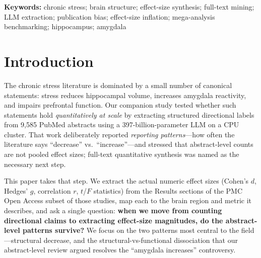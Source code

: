 \documentclass[11pt]{article}
\begin{document}
\begin{abstract}
\textbf{Conclusions.} Moving from count-based reporting patterns to extracted
effect-size magnitudes confirms the \emph{direction} of stress-related structural
decrease, but benchmarking against consortium mega-analyses shows the extracted
\emph{magnitudes} are inflated several-fold---demonstrating that large-scale LLM
mining of published text can quantify, rather than escape, the field's
publication bias. We are transparent about the pipeline's validated direction
accuracy (94\%), its mapping yield ($\sim$43\%), and the absence of usable sample
sizes for formal pooling; these define the boundary between this synthesis and a
definitive meta-analysis. The list of all included studies is provided as
Supplementary Table~S1.
\end{abstract}

\medskip
\noindent\textbf{Keywords:} chronic stress; brain structure; effect-size
synthesis; full-text mining; LLM extraction; publication bias; effect-size
inflation; mega-analysis benchmarking; hippocampus; amygdala

\section{Introduction}

The chronic stress literature is dominated by a small number of canonical
statements: stress reduces hippocampal volume, increases amygdala reactivity,
and impairs prefrontal function. Our companion study \cite{kang2026scoping}
tested whether such statements hold \emph{quantitatively at scale} by extracting
structured directional labels from 9{,}585 PubMed abstracts using a
397-billion-parameter LLM on a CPU cluster. That work deliberately reported
\emph{reporting patterns}---how often the literature says ``decrease'' vs.\
``increase''---and stressed that abstract-level counts are not pooled effect
sizes; full-text quantitative synthesis was named as the necessary next step.

This paper takes that step. We extract the actual numeric effect sizes (Cohen's
$d$, Hedges' $g$, correlation $r$, $t$/$F$ statistics) from the Results sections
of the PMC Open Access subset of those studies, map each to the brain region and
metric it describes, and ask a single question: \textbf{when we move from
counting directional claims to extracting effect-size magnitudes, do the
abstract-level patterns survive?} We focus on the two patterns most central to
the field---structural decrease, and the structural-vs-functional dissociation
that our abstract-level review argued resolves the ``amygdala increases''
controversy.
\end{document}
